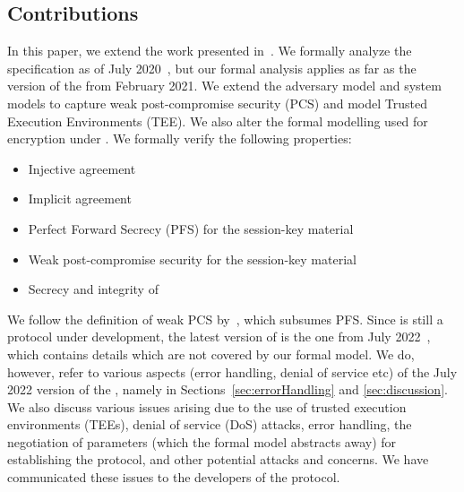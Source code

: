 \subsection{Contributions}
\label{sec:contributions}
In this paper, we extend the work presented in~\cite{Norr21}.
%
We formally analyze the \mEdhoc{} specification as of July
2020~\cite{our-analysis-selander-lake-edhoc-00}, but our formal analysis applies as far as the version of the \mSpec{} from February 2021.
%
We extend the adversary model and \mTamarin{} system models to capture weak
post-compromise security (PCS) and model Trusted Execution Environments
(TEE).
%
We also alter the formal modelling used for encryption under \mXor{}.
%
We formally verify the following properties:
\begin{itemize}
\item Injective agreement
\item Implicit agreement
\item Perfect Forward Secrecy (PFS) for the session-key material
\item Weak post-compromise security for the session-key material
\item Secrecy and integrity of \mADthree
\end{itemize}
%
We follow the definition of weak PCS by~\cite{DBLP:conf/csfw/Cohn-GordonCG16},
which subsumes PFS.
%
Since \mEdhoc{} is still a protocol under development, the latest version of \mEdhoc{} is the one from July 2022~\cite{draft-ietf-lake-edhoc-15}, which contains details which are not covered by our formal model.
%
We do, however, refer to various aspects
(error handling, denial of service etc) of the July 2022 version of the \mSpec{}, namely 
in Sections~\ref{sec:errorHandling} and \ref{sec:discussion}.
%
We also discuss various issues arising due to the use of trusted
execution environments (TEEs), denial of service (DoS) attacks, error handling,
the negotiation of parameters (which the formal model abstracts
away) for establishing the protocol, and other potential attacks and concerns.
%
We have communicated these issues to the developers of the protocol.
%